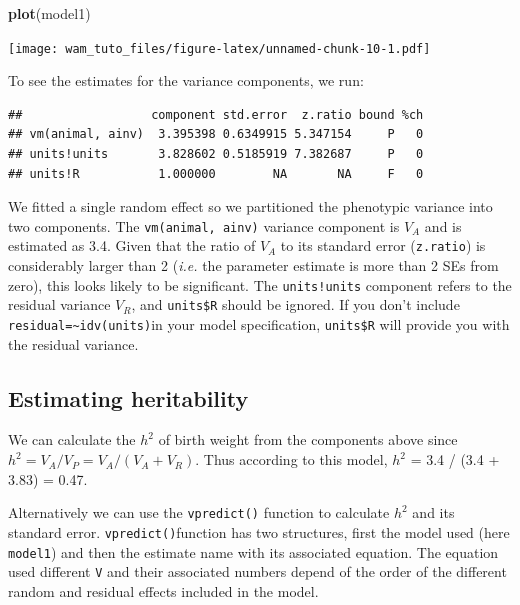 \documentclass[
  12pt,
]{book}
\newenvironment{Shaded}{\begin{snugshade}}{\end{snugshade}}
\newcommand{\KeywordTok}[1]{\textcolor[rgb]{0.13,0.29,0.53}{\textbf{#1}}}
\newcommand{\NormalTok}[1]{#1}
\newcommand{\OperatorTok}[1]{\textcolor[rgb]{0.81,0.36,0.00}{\textbf{#1}}}
\begin{document}
\begin{Shaded}
\begin{Highlighting}[]
\KeywordTok{plot}\NormalTok{(model1)}
\end{Highlighting}
\end{Shaded}

\texttt{[image: wam\_tuto\_files/figure-latex/unnamed-chunk-10-1.pdf]}

To see the estimates for the variance components, we run:

\begin{Shaded}
\end{Shaded}

\begin{verbatim}
##                  component std.error  z.ratio bound %ch
## vm(animal, ainv)  3.395398 0.6349915 5.347154     P   0
## units!units       3.828602 0.5185919 7.382687     P   0
## units!R           1.000000        NA       NA     F   0
\end{verbatim}

We fitted a single random effect so we partitioned the phenotypic variance into two components. The \texttt{vm(animal,\ ainv)} variance component is \(V_A\) and is estimated as 3.4. Given that the ratio of \(V_A\) to its standard error (\texttt{z.ratio}) is considerably larger than 2 (\emph{i.e.} the parameter estimate is more than 2 SEs from zero), this looks likely to be significant. The \texttt{units!units} component refers to the residual variance \(V_R\), and \texttt{units\$R} should be ignored. If you don't include \texttt{residual=\textasciitilde{}idv(units)}in your model specification, \texttt{units\$R} will provide you with the residual variance.

\hypertarget{estimating-heritability}{%
\subsection{Estimating heritability}\label{estimating-heritability}}

We can calculate the \(h^2\) of birth weight from the components above since \(h^2 = V_A/V_P = V_A/(V_A+V_R)\). Thus according to this model, \(h^2\) = 3.4 / (3.4 + 3.83) = 0.47.

Alternatively we can use the \texttt{vpredict()} function to calculate \(h^2\) and its standard error. \texttt{vpredict()}function has two structures, first the model used (here \texttt{model1}) and then the estimate name with its associated equation. The equation used different \texttt{V} and their associated numbers depend of the order of the different random and residual effects included in the model.
\end{document}
